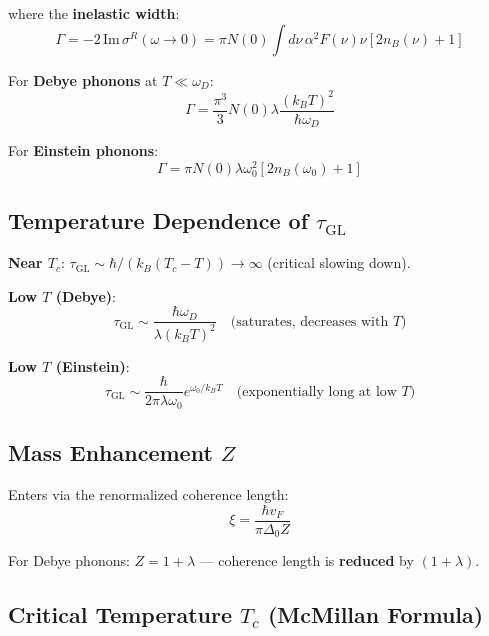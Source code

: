\documentclass[12pt]{article}
\begin{document}
where the \textbf{inelastic width}:
\begin{equation}
\boxed{
\Gamma = -2\,\text{Im}\,\sigma^R(\omega \to 0) = \pi N(0) \int d\nu \, \alpha^2F(\nu) \nu [2n_B(\nu) + 1]
}
\end{equation}

For \textbf{Debye phonons} at $T \ll \omega_D$:
\begin{equation}
\boxed{
\Gamma = \frac{\pi^3}{3} N(0) \lambda \frac{(k_B T)^2}{\hbar\omega_D}
}
\end{equation}

For \textbf{Einstein phonons}:
\begin{equation}
\Gamma = \pi N(0) \lambda \omega_0^2 [2n_B(\omega_0) + 1]
\end{equation}

\subsection{Temperature Dependence of $\tau_{\text{GL}}$}

\textbf{Near $T_c$}: $\tau_{\text{GL}} \sim \hbar/(k_B(T_c - T)) \to \infty$ (critical slowing down).

\textbf{Low $T$ (Debye)}:
\begin{equation}
\tau_{\text{GL}} \sim \frac{\hbar\omega_D}{\lambda(k_B T)^2} \quad \text{(saturates, decreases with $T$)}
\end{equation}

\textbf{Low $T$ (Einstein)}:
\begin{equation}
\tau_{\text{GL}} \sim \frac{\hbar}{2\pi\lambda\omega_0} e^{\omega_0/k_B T} \quad \text{(exponentially long at low $T$)}
\end{equation}

\subsection{Mass Enhancement $Z$}

Enters via the renormalized coherence length:
\begin{equation}
\xi = \frac{\hbar v_F}{\pi \Delta_0 Z}
\end{equation}

For Debye phonons: $Z = 1 + \lambda$ — coherence length is \textbf{reduced} by $(1+\lambda)$.

\subsection{Critical Temperature $T_c$ (McMillan Formula)}
\end{document}
